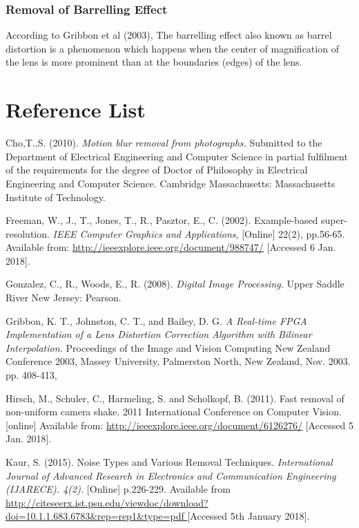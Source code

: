 \documentclass[a4paper, 12pt]{article}
\begin{document}
\subsubsection{ Removal of Barrelling Effect}

According to Gribbon et al (2003), The barrelling effect also known as barrel distortion is a phenomenon which happens when the center of magnification of the lens is more prominent than at the boundaries (edges) of the lens.
 

\newpage

\section{Reference List} 

Cho,T.,S. (2010). \textit{Motion blur removal from photographs.} Submitted to the Department of Electrical Engineering and Computer Science in partial fulfilment of the requirements for the degree of Doctor of Philosophy in Electrical Engineering and Computer Science. Cambridge Massachusetts: Massachusetts Institute of Technology.
 
Freeman, W., J., T., Jones, T., R.,  Pasztor, E., C. (2002). Example-based super-resolution. \textit{IEEE Computer Graphics and Applications}, [Online] 22(2), pp.56-65. Available from: \url{http://ieeexplore.ieee.org/document/988747/} [Accessed 6 Jan. 2018].

Gonzalez, C., R., Woods, E., R. (2008). \textit{Digital Image Processing.} Upper Saddle River New Jersey: Pearson.

Gribbon, K. T., Johnston, C. T., and Bailey, D.
G. \textit{A Real-time FPGA Implementation of a
Lens Distortion Correction Algorithm with
Bilinear Interpolation.} Proceedings of the
Image and Vision Computing New Zealand
Conference 2003, Massey University,
Palmerston North, New Zealand, Nov. 2003. pp. 408-413,

Hirsch, M., Schuler, C., Harmeling, S. and Scholkopf, B. (2011). Fast removal of non-uniform camera shake. 2011 International Conference on Computer Vision. [online] Available from: \url{http://ieeexplore.ieee.org/document/6126276/} [Accessed 5 Jan. 2018].

Kaur, S. (2015). Noise Types and Various Removal Techniques. \textit{International Journal of Advanced Research in Electronics and Communication Engineering (IJARECE). 4(2).} [Online] p.226-229. Available from \url{http://citeseerx.ist.psu.edu/viewdoc/download?doi=10.1.1.683.6783&rep=rep1&type=pdf
} [Accessed 5th January 2018].
\end{document}
